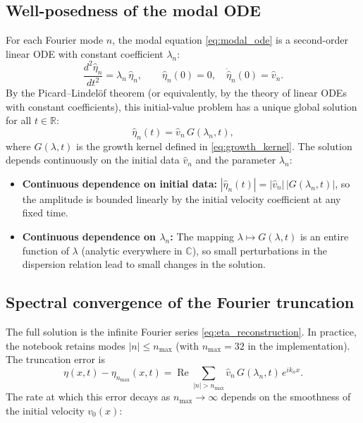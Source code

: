 \documentclass[11pt,a4paper]{article}
\begin{document}
\subsection{Well-posedness of the modal ODE}

For each Fourier mode $n$, the modal equation \eqref{eq:modal_ode} is a second-order linear ODE with constant coefficient $\lambda_n$:
\begin{equation}
    \frac{d^2\widehat{\eta}_n}{dt^2} = \lambda_n\,\widehat{\eta}_n,
    \qquad
    \widehat{\eta}_n(0) = 0,
    \quad
    \dot{\widehat{\eta}}_n(0) = \widehat{v}_n.
\end{equation}
By the Picard--Lindel\"of theorem (or equivalently, by the theory of linear ODEs with constant coefficients), this initial-value problem has a unique global solution for all $t\in\mathbb{R}$:
\begin{equation}
    \widehat{\eta}_n(t) = \widehat{v}_n\,G(\lambda_n,t),
\end{equation}
where $G(\lambda,t)$ is the growth kernel defined in \eqref{eq:growth_kernel}.  The solution depends continuously on the initial data $\widehat{v}_n$ and the parameter $\lambda_n$:
\begin{itemize}[leftmargin=*]
    \item \textbf{Continuous dependence on initial data:}  $|\widehat{\eta}_n(t)| = |\widehat{v}_n|\,|G(\lambda_n,t)|$, so the amplitude is bounded linearly by the initial velocity coefficient at any fixed time.
    \item \textbf{Continuous dependence on $\lambda_n$:}  The mapping $\lambda\mapsto G(\lambda,t)$ is an entire function of $\lambda$ (analytic everywhere in $\mathbb{C}$), so small perturbations in the dispersion relation lead to small changes in the solution.
\end{itemize}

\subsection{Spectral convergence of the Fourier truncation}

The full solution is the infinite Fourier series \eqref{eq:eta_reconstruction}.  In practice, the notebook retains modes $|n|\le n_{\max}$ (with $n_{\max}=32$ in the implementation).  The truncation error is
\begin{equation}
    \eta(x,t) - \eta_{n_{\max}}(x,t)
    =
    \operatorname{Re}
    \sum_{|n|>n_{\max}}
    \widehat{v}_n\,G(\lambda_n,t)\,e^{ik_n x}.
\end{equation}
The rate at which this error decays as $n_{\max}\to\infty$ depends on the smoothness of the initial velocity $v_0(x)$:
\end{document}

